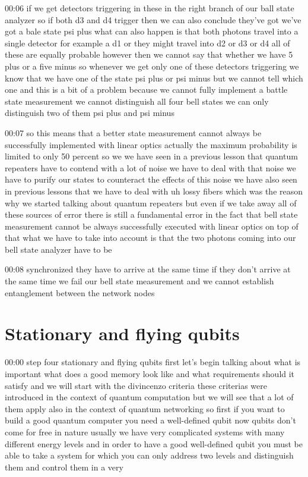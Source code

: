 00:06
if we get detectors triggering in these in the right branch of our ball state
analyzer so if both d3 and d4 trigger then we can also conclude
they've got we've got a bale state psi plus what can also happen is that both
photons travel into a single detector for example a d1 or they might travel
into d2 or d3 or d4 all of these are equally probable
however then we cannot say that whether we have
5 plus or a five minus so whenever we get only one of these detectors triggering
we know that we have one of the state psi plus or psi minus but we cannot tell
which one and this is a bit of a problem because we cannot
fully implement a battle state measurement we cannot distinguish
all four bell states we can only distinguish two of them psi plus and psi minus

00:07
so this means that a better state measurement cannot always be successfully
implemented with linear optics actually the maximum
probability is limited to only 50 percent
so we we have seen in a previous lesson that quantum repeaters have to contend
with a lot of noise we have to deal with that noise we have to purify our states
to counteract the effects of this noise we have also seen in previous lessons
that we have to deal with uh lossy fibers which was the reason why we
started talking about quantum repeaters but even if we take away all of these
sources of error there is still a fundamental error
in the fact that bell state measurement cannot be
always successfully executed with linear optics
on top of that what we have to take into account is that the two photons
coming into our bell state analyzer have to be

00:08
synchronized they have to arrive at the same time
if they don't arrive at the same time we fail our bell state measurement
and we cannot establish entanglement between the network nodes

\section{Stationary and flying qubits}


00:00
step four stationary and flying qubits first let's begin talking about
what is important what does a good memory look like and what requirements should
it satisfy and we will start with the divincenzo criteria
these criterias were introduced in the context of quantum computation
but we will see that a lot of them apply also in the context of quantum
networking so first if you want to build a good quantum computer
you need a well-defined qubit now qubits
don't come for free in nature usually we have very complicated systems with many
different energy levels and in order to have a
good well-defined qubit you must be able to take a system
for which you can only address two levels
and distinguish them and control them in a very

